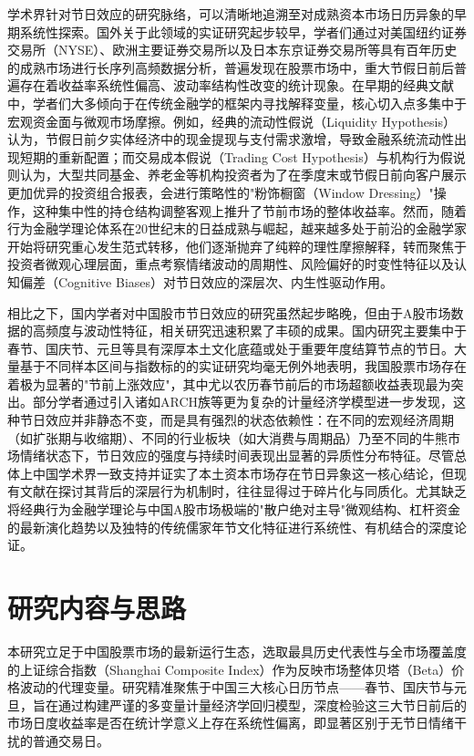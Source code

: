 \documentclass{cupb-thesis}
\begin{document}
学术界针对节日效应的研究脉络，可以清晰地追溯至对成熟资本市场日历异象的早期系统性探索。国外关于此领域的实证研究起步较早，学者们通过对美国纽约证券交易所（NYSE）、欧洲主要证券交易所以及日本东京证券交易所等具有百年历史的成熟市场进行长序列高频数据分析，普遍发现在股票市场中，重大节假日前后普遍存在着收益率系统性偏高、波动率结构性改变的统计现象。在早期的经典文献中，学者们大多倾向于在传统金融学的框架内寻找解释变量，核心切入点多集中于宏观资金面与微观市场摩擦。例如，经典的流动性假说（Liquidity Hypothesis）认为，节假日前夕实体经济中的现金提现与支付需求激增，导致金融系统流动性出现短期的重新配置；而交易成本假说（Trading Cost Hypothesis）与机构行为假说则认为，大型共同基金、养老金等机构投资者为了在季度末或节假日前向客户展示更加优异的投资组合报表，会进行策略性的"粉饰橱窗（Window Dressing）"操作，这种集中性的持仓结构调整客观上推升了节前市场的整体收益率。然而，随着行为金融学理论体系在20世纪末的日益成熟与崛起，越来越多处于前沿的金融学家开始将研究重心发生范式转移，他们逐渐抛弃了纯粹的理性摩擦解释，转而聚焦于投资者微观心理层面，重点考察情绪波动的周期性、风险偏好的时变性特征以及认知偏差（Cognitive Biases）对节日效应的深层次、内生性驱动作用。


相比之下，国内学者对中国股市节日效应的研究虽然起步略晚，但由于A股市场数据的高频度与波动性特征，相关研究迅速积累了丰硕的成果。国内研究主要集中于春节、国庆节、元旦等具有深厚本土文化底蕴或处于重要年度结算节点的节日。大量基于不同样本区间与指数标的的实证研究均毫无例外地表明，我国股票市场存在着极为显著的"节前上涨效应"，其中尤以农历春节前后的市场超额收益表现最为突出。部分学者通过引入诸如ARCH族等更为复杂的计量经济学模型进一步发现，这种节日效应并非静态不变，而是具有强烈的状态依赖性：在不同的宏观经济周期（如扩张期与收缩期）、不同的行业板块（如大消费与周期品）乃至不同的牛熊市场情绪状态下，节日效应的强度与持续时间表现出显著的异质性分布特征。尽管总体上中国学术界一致支持并证实了本土资本市场存在节日异象这一核心结论，但现有文献在探讨其背后的深层行为机制时，往往显得过于碎片化与同质化。尤其缺乏将经典行为金融学理论与中国A股市场极端的"散户绝对主导"微观结构、杠杆资金的最新演化趋势以及独特的传统儒家年节文化特征进行系统性、有机结合的深度论证。


\section{研究内容与思路}


本研究立足于中国股票市场的最新运行生态，选取最具历史代表性与全市场覆盖度的上证综合指数（Shanghai Composite Index）作为反映市场整体贝塔（Beta）价格波动的代理变量。研究精准聚焦于中国三大核心日历节点——春节、国庆节与元旦，旨在通过构建严谨的多变量计量经济学回归模型，深度检验这三大节日前后的市场日度收益率是否在统计学意义上存在系统性偏离，即显著区别于无节日情绪干扰的普通交易日。
\end{document}

